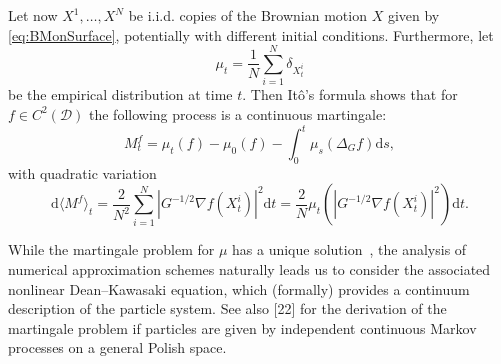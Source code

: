 \documentclass[11pt, a4paper]{article}
\newcommand{\mathd}{\mathrm{d}}
\begin{document}
Let now $X^1, \ldots, X^N$ be i.i.d. copies of the Brownian motion $X$ given by \eqref{eq:BMonSurface}, potentially with different
initial conditions. Furthermore, let
\begin{equation}
        \mu_t = \frac{1}{N} \sum_{i = 1}^N \delta_{X^i_t}
\end{equation}
be the empirical distribution at time $t$. Then It{\^o}'s formula shows that
for $f \in C^2(\mathcal{D})$  the following process is a continuous martingale:
\begin{equation}\label{eq:sDK-martingale-problem}
    M^{f}_t = \mu_t (f) - \mu_0(f) - \int_0^t \mu_s (\Delta_G f) \mathd s,
\end{equation}
with quadratic variation
\begin{equation}\label{eq:sDK-martingale-QV}
    \mathd \langle M^{f} \rangle_t = \frac{2}{N^2} \sum_{i = 1}^N | G^{- 1 /
   2} \nabla f (X^i_t) |^2 \mathd t = \frac{2}{N} \mu_t (| G^{- 1 /
   2} \nabla f (X^i_t) |^2) \mathd t.
\end{equation}



While the martingale problem for $\mu$ has a unique solution~\cite{Konarovskyi}, the analysis of numerical approximation schemes naturally leads us to consider the associated nonlinear Dean--Kawasaki equation, which (formally) provides a continuum description of the particle system.
See also [22] for the derivation of the martingale problem if particles are given by independent continuous Markov processes on a general Polish space.

\end{document}
